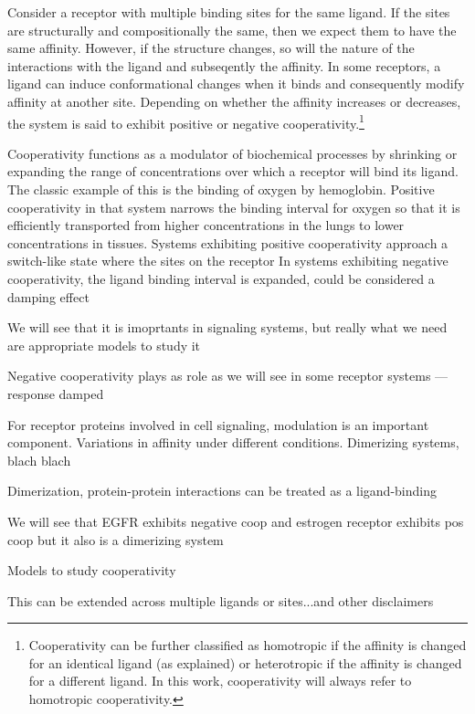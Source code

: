 Consider a receptor with multiple binding sites for the same ligand. If the sites are structurally and compositionally the same, then we expect them to have the same affinity. However, if the structure changes, so will the nature of the interactions with the ligand and subseqently the affinity. In some receptors, a ligand can induce conformational changes when it binds and consequently modify affinity at another site. Depending on whether the affinity increases or decreases, the system is said to exhibit positive or negative cooperativity.\footnote{Cooperativity can be further classified as homotropic if the affinity is changed for an identical ligand (as explained) or heterotropic if the affinity is changed for a different ligand. In this work, cooperativity will always refer to homotropic cooperativity.} 

Cooperativity functions as a modulator of biochemical processes by shrinking or expanding the range of concentrations over which a receptor will bind its ligand. The classic example of this is the binding of oxygen by hemoglobin. Positive cooperativity in that system narrows the binding interval for oxygen so that it is efficiently transported from higher concentrations in the lungs to lower concentrations in tissues. Systems exhibiting positive cooperativity approach a switch-like state where the sites on the receptor   In systems exhibiting negative cooperativity, the ligand binding interval is expanded, could be considered a damping effect

We will see that it is imoprtants in signaling systems, but really what we need are appropriate models to study it



Negative cooperativity plays as role as we will see in some receptor systems --- response damped


For receptor proteins involved in cell signaling, modulation is an important component. Variations in affinity under different conditions. Dimerizing systems, blach blach

Dimerization, protein-protein interactions can be treated as a ligand-binding

We will see that EGFR exhibits negative coop and estrogen receptor exhibits pos coop but it also is a dimerizing system

Models to study cooperativity

This can be extended across multiple ligands or sites...and other disclaimers